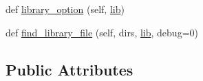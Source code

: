 \begin{DoxyCompactItemize}
\item 
def \hyperlink{classsetuptools_1_1__distutils_1_1__msvccompiler_1_1MSVCCompiler_ae989c34965b955d993a5af4270844a6a}{library\+\_\+option} (self, \hyperlink{classsetuptools_1_1__distutils_1_1__msvccompiler_1_1MSVCCompiler_a548983374c235cc16a0627d165f723e8}{lib})
\item 
def \hyperlink{classsetuptools_1_1__distutils_1_1__msvccompiler_1_1MSVCCompiler_a36a5484b972b6cf9f0bb7eabba7c5d1f}{find\+\_\+library\+\_\+file} (self, dirs, \hyperlink{classsetuptools_1_1__distutils_1_1__msvccompiler_1_1MSVCCompiler_a548983374c235cc16a0627d165f723e8}{lib}, debug=0)
\end{DoxyCompactItemize}
\subsection*{Public Attributes}

